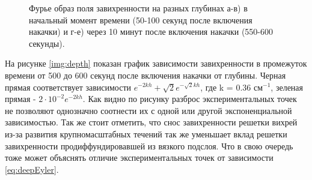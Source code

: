 \begin{figure}[ht]
  \begin{minipage}[ht]{0.326\linewidth}
  \end{minipage}
  \hfill
  \begin{minipage}[ht]{0.326\linewidth}
  \end{minipage}
  \begin{minipage}[ht]{0.326\linewidth}
  \end{minipage}
  \begin{minipage}[ht]{0.326\linewidth}
  \end{minipage}
  \hfill
  \begin{minipage}[ht]{0.326\linewidth}
  \end{minipage}
  \begin{minipage}[ht]{0.326\linewidth}
  \end{minipage}  
  \caption{Фурье образ поля завихренности на разных глубинах а-в) в начальный момент времени (50-100 секунд после включения накачки) и г-е) через 10 минут после включения накачки (550-600 секунды).}
  \label{img:detphFFT}  
\end{figure}



На рисунке \ref{img:depth} показан график зависимости завихренности в промежуток времени от 500 до 600 секунд после включения накачки от глубины. Черная прямая соответствует зависимости $e^{-2kh}+\sqrt{2}e^{-\sqrt{2}kh}$, где k = 0.36 см$^{-1}$, зеленая прямая - $2 \cdot 10^{-2} e^{-2kh}$. Как видно по рисунку разброс экспериментальных точек не позволяют однозначно соотнести их с одной или другой экспоненциальной зависимостью. Так же стоит отметить, что снос завихренности решетки вихрей из-за развития крупномасштабных течений так же уменьшает вклад решетки завихренности продиффундировавшей из вязкого подслоя. Что в свою очередь тоже может объяснять отличие экспериментальных точек от зависимости \ref{eq:deepEyler}.

